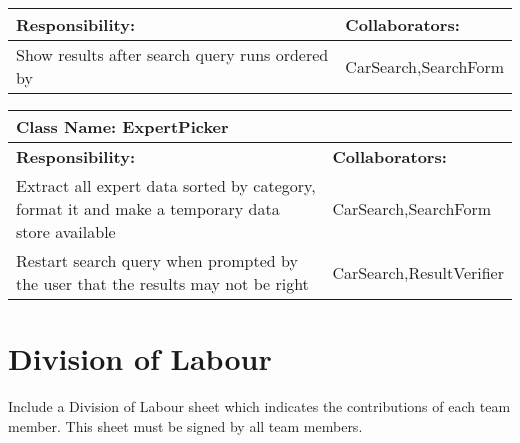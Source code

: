 \documentclass[12pt]{article}
\begin{document}
\begin{enumerate}[a)]
\begin{table}[ht]
\begin{tabular}{|p{5cm}|p{5cm}|}
		\textbf{Responsibility:} & \textbf{Collaborators:} \\
		\hline
		Show results after search query runs ordered by  & CarSearch,SearchForm\\
		\hline
		\end{tabular}
	\end{table}
	\begin{table}[ht]
		\centering
		\begin{tabular}{|p{5cm}|p{5cm}|}
		\hline 
		 \multicolumn{2}{|l|}{\textbf{Class Name:} ExpertPicker} \\
		\hline
		\textbf{Responsibility:} & \textbf{Collaborators:} \\
		\hline
		Extract all expert data sorted by category, format it and make a temporary data store available & CarSearch,SearchForm\\
		Restart search query when prompted by the user that the results may not be right & CarSearch,ResultVerifier\\
		\hline
		\end{tabular}
	\end{table}
	
\end{enumerate}

\FloatBarrier
\appendix
\section{Division of Labour}
\label{sec:division_of_labour}
Include a Division of Labour sheet which indicates the contributions of each team member. This sheet must be signed by all team members.

\newpage
\end{document}
